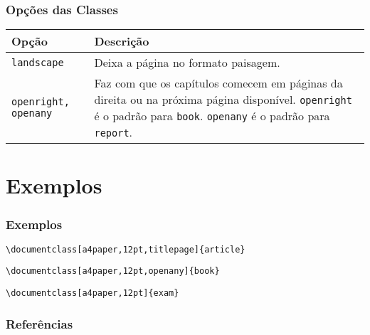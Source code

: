 \documentclass[brazilian]{beamer}
\begin{document}
\begin{frame}
    \frametitle{Opções das Classes}
    \begin{table}[h]\small
        \begin{tabularx}{\textwidth}{m{4cm}X}
            \hline
            \textbf{Opção}              & \textbf{Descrição}                                                                                                                                                                          \\ \hline
            \texttt{landscape}          & Deixa a página no formato paisagem.                                                                                                                                                         \\ \hline
            \texttt{openright, openany} & Faz com que os capítulos comecem em páginas da direita ou na próxima página disponível. \texttt{openright} é o padrão para \texttt{book}. \texttt{openany} é o padrão para \texttt{report}. \\ \hline
        \end{tabularx}
    \end{table}
\end{frame}

\section{Exemplos}

\begin{frame}[fragile]
    \frametitle{Exemplos}
    \begin{lstlisting}[style=myStyleLatex]
    \documentclass[a4paper,12pt,titlepage]{article}
\end{lstlisting}
    \begin{lstlisting}[style=myStyleLatex]
    \documentclass[a4paper,12pt,openany]{book}
\end{lstlisting}
    \begin{lstlisting}[style=myStyleLatex]
    \documentclass[a4paper,12pt]{exam}
\end{lstlisting}
    
\end{frame}

\begin{frame}
    \frametitle{Referências}
    \nocite{WikibooksLatex,BeamerDocumentation,ExamDocumentation,latex24h}
    \printbibliography[]
    
\end{frame}
\end{document}
